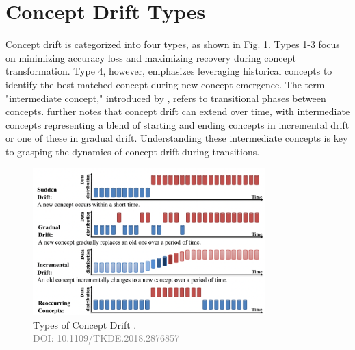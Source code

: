 \section{Concept Drift Types}
\label{sec:background_concept_drift_types}
Concept drift is categorized into four types, as shown in Fig. \ref{fig:concept-drift-types}. Types 1-3 focus on minimizing accuracy loss and maximizing recovery during concept transformation. Type 4, however, emphasizes leveraging historical concepts to identify the best-matched concept during new concept emergence. The term "intermediate concept," introduced by \cite{losing2016knn}, refers to transitional phases between concepts. \cite{liu2018making} further notes that concept drift can extend over time, with intermediate concepts representing a blend of starting and ending concepts in incremental drift or one of these in gradual drift. Understanding these intermediate concepts is key to grasping the dynamics of concept drift during transitions.
\vspace{-3mm}
\begin{figure}[H]
    \centering
    \includegraphics[width=0.8\textwidth]{2_Background/figures/concept_drift_types.png}
    \caption{Types of Concept Drift \cite{8496795}. \\ \textcolor{gray}{\fontsize{10}{0}\selectfont DOI: 10.1109/TKDE.2018.2876857}}
    \label{fig:concept-drift-types}
\end{figure}
\vspace{-6mm}

